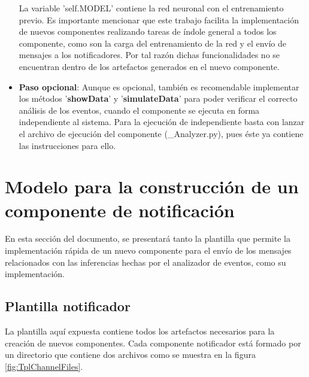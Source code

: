 \begin{itemize}
            
            
            La variable 'self.MODEL' contiene la red neuronal con el entrenamiento previo. Es importante mencionar que este trabajo facilita la implementación de nuevos componentes realizando tareas de índole general a todos los componente, como son la carga del entrenamiento de la red y el envío de mensajes a los notificadores. Por tal razón dichas funcionalidades no se encuentran dentro de los artefactos generados en el nuevo componente.
            
            \item \textbf{Paso opcional}: Aunque es opcional, también es recomendable implementar los métodos '\textbf{showData}' y '\textbf{simulateData}' para poder verificar el correcto análisis de los eventos, cuando el componente se ejecuta en forma independiente al sistema. Para la ejecución de independiente basta con lanzar el archivo de ejecución del componente (\_Analyzer.py), pues éste ya contiene las instrucciones para ello.
            
        \end{itemize}
        
    \newpage
    
\section{Modelo para la construcción de un componente de notificación}
\label{Sec:NotifierChannelTemplate}

    En esta sección del documento, se presentará tanto la plantilla que permite la implementación rápida de un nuevo componente para el envío de los mensajes relacionados con las inferencias hechas por el analizador de eventos, como su implementación.

    \subsection{Plantilla notificador}
    \label{sub:TplChannel}
        
        La plantilla aquí expuesta contiene todos los artefactos necesarios para la creación de nuevos componentes. Cada componente notificador está formado por un directorio que contiene dos archivos como se muestra en la figura \ref{fig:TplChannelFiles}.
    

